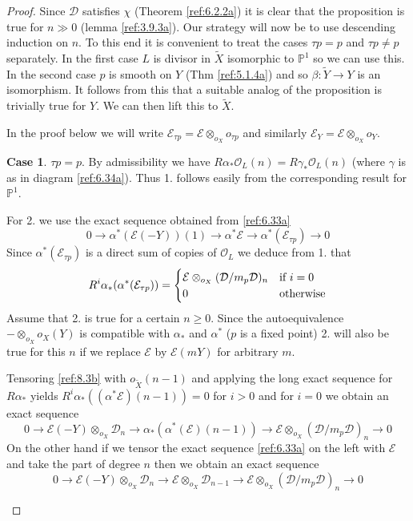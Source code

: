\documentclass{amsproc}
\def \PP{{\mathbb P}}
\def\Dscr{{\mathcal D}}
\def\Escr{{\mathcal E}}
\def\Oscr{{\mathcal O}}
\def\r{\rightarrow}
\let\oldtext\text
\def\text#1{\oldtext{\upshape #1}}
\theoremstyle{definition}
\newtheorem{case}{Case}
\theoremstyle{remark}
\numberwithin{equation}{section}
\numberwithin{table}{section}
\numberwithin{figure}{section}
\begin{document}
\begin{proof}
  Since $\Dscr$ satisfies $\chi$ (Theorem
  \ref{ref:6.2.2a}) it is clear that the proposition is true for
  $n\gg 0$ (lemma \ref{ref:3.9.3a}). Our strategy will
  now be to use descending induction on $n$. To this end it is
  convenient to treat the cases $\tau p=p$ and $\tau p\neq p$
  separately. In the first case $L$ is divisor in $\tilde{X}$
  isomorphic to $\PP^1$ so we can use this. In the second case $p$ is
  smooth on $Y$ (Thm \ref{ref:5.1.4a}) and so 
  $\beta:\tilde{Y}\r Y$ is an isomorphism. It follows from this that a
  suitable analog of the proposition  is trivially true for $Y$. We can
  then lift this to $\tilde{X}$.
 
In the proof below we will write $\Escr_{\tau p}=\Escr\otimes_{o_X}
o_{\tau p}$ and similarly $\Escr_Y=\Escr\otimes_{o_X}o_Y$.


\begin{case} $\tau p=p$.
By admissibility we have
  $R\alpha_\ast
  \Oscr_L(n)=R\gamma_\ast \Oscr_L(n)$ (where $\gamma$ is as in diagram
  \eqref{ref:6.34a}). Thus 1. follows easily
  from the corresponding result for $\PP^1$.

For 2. we use the exact sequence obtained from
\eqref{ref:6.33a}
\begin{equation}
\label{ref:8.3b}
0\r \alpha^\ast(\Escr(-Y))(1)\r \alpha^\ast \Escr\r  \alpha^\ast(
\Escr_{\tau p})\r 0
\end{equation}
Since $\alpha^\ast(
\Escr_{\tau p})$ is a direct sum of copies of 
$\Oscr_L$ we deduce from 1. that 
\[
R^i\alpha_\ast (\alpha^\ast(
\Escr_{\tau p}))=
\begin{cases} 
\Escr\otimes_{o_X} (\Dscr/m_p\Dscr)_n &\text{if $i=0$}\\
0&\text{otherwise}
\end{cases}
\]
Assume that 2. is true for a
certain $n\ge 0$. Since the autoequivalence $-\otimes_{o_X} o_X(Y)$ is
compatible with $\alpha_\ast$ and $\alpha^\ast$ ($p$ is a fixed point)
2. will also be true for this $n$ if we
replace $\Escr$ by $\Escr(mY)$ for arbitrary $m$.



Tensoring  \eqref{ref:8.3b} with
$o_{\tilde X}(n-1)$
and applying the long exact sequence for $R\alpha_\ast$ yields
$R^i\alpha_\ast ((\alpha^\ast\Escr)(n-1))=0$ for $i>0$ and for $i=0$ we obtain
an exact sequence
\begin{equation}
\label{ref:8.4a}
0\r \Escr(-Y)\otimes_{o_X} \Dscr_n \r \alpha_\ast(\alpha^\ast (\Escr
)(n-1)) \r \Escr\otimes_{o_X} (\Dscr/m_p\Dscr)_n\r 0
\end{equation}
On the other hand if we tensor the exact sequence \eqref{ref:6.33a} on the left
with $\Escr$  and take the part of degree $n$ then we obtain an exact
sequence
\[
0\r \Escr(-Y)\otimes_{o_X} \Dscr_n\r \Escr \otimes_{o_X} \Dscr_{n-1}
\r \Escr\otimes_{o_X} (\Dscr/m_p\Dscr)_n\r 0
\]



\end{case}
\end{proof}
\end{document}
